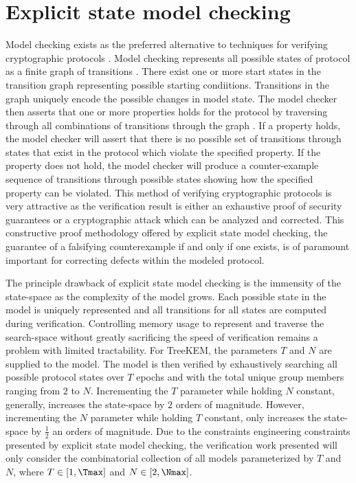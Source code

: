\hypertarget{sec:explicit-state-model-checking}{%
\section{Explicit state model checking}\label{sec:explicit-state-model-checking}}

Model checking exists as the preferred alternative to  techniques for verifying cryptographic protocols \autocite{kacprzak2006comparing, lomuscio2007verification, van2004symbolic}.
Model checking represents all possible states of protocol as a finite graph of transitions \autocite{clarke1981design}.
There exist one or more start states in the transition graph representing possible starting condiitions.
Transitions in the graph uniquely encode the possible changes in model state.
The model checker then asserts that one or more properties holds for the protocol by traversing through all combinations of transitions through the graph \autocite{Vardi1986}.
If a property holds, the model checker will assert that there is no possible set of transitions through states that exist in the protocol which violate the specified property.
If the property does not hold, the model checker will produce a counter-example sequence of transitions through possible states showing how the specified property can be violated.
This method of verifying cryptographic protocols is very attractive as the verification result is either an exhaustive proof of security guarantees or a cryptographic attack which can be analyzed and corrected.
This constructive proof methodology offered by explicit state model checking, the guarantee of a falsifying counterexample if and only if one exists, is of paramount important for correcting defects within the modeled protocol.

The principle drawback of explicit state model checking is the immensity of the state-space as the complexity of the model grows.
Each possible state in the model is uniquely represented and all transitions for all states are computed during verification.
Controlling memory usage to represent and traverse the search-space without greatly sacrificing the speed of verification remains a problem with limited tractability.
For TreeKEM, the parameters \(T\) and \(N\) are supplied to the model.
The model is then verified by exhaustively searching all possible protocol states over \(T\) epochs and with the total unique group members ranging from \(2\) to \(N\).
Incrementing the \(T\) parameter while holding \(N\) constant, generally, increases the state-space by \(2\) orders of magnitude.
However, incrementing the \(N\) parameter while holding \(T\) constant, only increases the state-space by \(\frac{1}{2}\) an orders of magnitude.
Due to the constraints engineering constraints presented by explicit state model checking, the verification work presented will only consider the combinatorial collection of all models parameterized by \(T\) and \(N\), where \(T \in [1, \Tmax]\) and \(N \in [2, \Nmax]\).


